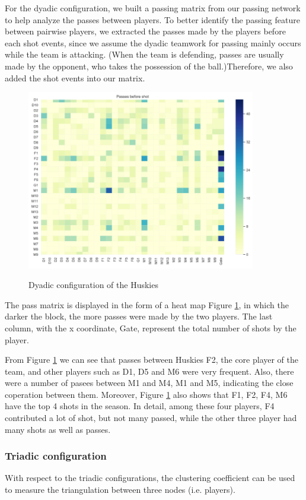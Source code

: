 \documentclass{mcmthesis}
\begin{document}
For the dyadic configuration, we built a passing matrix from our passing network to help analyze the passes between players. To better identify the passing feature between pairwise players, we extracted the passes made by the players before each shot events, since we assume the dyadic teamwork for passing mainly occurs while the team is attacking. (When the team is defending, passes are usually made by the opponent, who takes the possession of the ball.)Therefore, we also added the shot events into our matrix.
\begin{figure}[htbp]
  \centering
  \caption{Dyadic configuration of the Huskies}
  \includegraphics[width=10cm]{dyadic.png}
  \label{dyadic}
\end{figure}
The pass matrix is displayed in the form of a heat map Figure \ref{dyadic}, in which the darker the block, the more passes were made by the two players. The last column, with the x coordinate, Gate, represent the total number of shots by the player. 

From Figure \ref{dyadic} we can see that passes between Huskies F2, the core player of the team, and other players such as D1, D5 and M6 were very frequent. Also, there were a number of pasees between M1 and M4, M1 and M5, indicating the close coperation between them. Moreover, Figure \ref{dyadic} also shows that F1, F2, F4, M6 have the top 4 shots in the season. In detail, among these four players, F4 contributed a lot of shot, but not many passed, while the other three player had many shots as well as passes.

\subsubsection{Triadic configuration}

With respect to the triadic configurations, the clustering coefficient can be used to measure the triangulation between three nodes (i.e. players).
\end{document}
